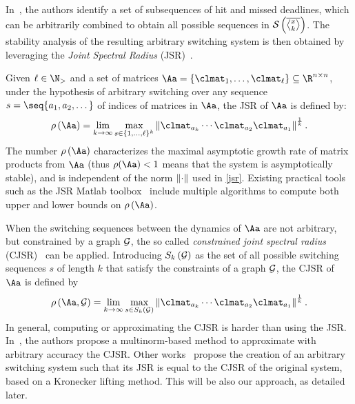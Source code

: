 In~\cite{Maggio:2020}, the authors identify a set of subsequences of hit and missed deadlines, which can be arbitrarily combined to obtain all possible sequences in $\sset{}{\rowmiss{}}$.
The stability analysis of the resulting arbitrary switching system is then obtained by leveraging the \emph{Joint Spectral Radius} (JSR)~\cite{rota}.

Given $\ell \in \N_{>}$ and a set of matrices $\Aa = \{\clmat_1, \ldots, \clmat_\ell \} \subseteq \R^{n\times n}$, under the hypothesis of arbitrary switching over any sequence $s=\seq{a_1,a_2,\dots}$ of indices of matrices in $\Aa$, the JSR of $\Aa$ is defined by:
\begin{equation}%
    \label{jsr}
    \rho\funof{\Aa} = \lim_{k\rightarrow\infty} \max_{s \in \{1,\ldots,\ell\}^k} \norm{\clmat_{a_k} \cdots \clmat_{a_2}\clmat_{a_1}}^{\frac{1}{k}}.
\end{equation}
The number $\rho\left(\Aa\right)$ characterizes the maximal asymptotic growth rate of matrix products from $\Aa$ (thus $\rho(\Aa) < 1$ means that the system is asymptotically stable), and is independent of the norm $\left\lVert\cdot\right\rVert$ used in \eqref{jsr}.
Existing practical tools such as the JSR Matlab toolbox~\cite{vankeerberghen2014jsr} include multiple algorithms to compute both upper and lower bounds on $\rho\left(\Aa\right)$.

When the switching sequences between the dynamics of $\Aa$ are not arbitrary, but constrained by a graph $\mathcal{G}_{}$, the so called \emph{constrained joint spectral radius} (CJSR)~\cite{dai2012gelfand} can be applied.
Introducing $S_k\left( \mathcal{G}_{} \right)$ as the set of all possible switching sequences $s$ of length $k$ that satisfy the constraints of a graph $\mathcal{G}_{}$, the CJSR of $\Aa$ is defined by
\begin{equation}%
    \label{cjsr}%
    \rho\funof{\Aa,\GG{}} = \lim_{k\rightarrow\infty} \max_{s \in S_k\funof{\GG{}}} \norm{\clmat_{a_k} \cdots \clmat_{a_2}\clmat_{a_1}}^{\frac{1}{k}}.
\end{equation}
In general, computing or approximating the CJSR is harder than using the JSR. 
In~\cite{philippe2016stability}, the authors propose a multinorm-based method to approximate with arbitrary accuracy the CJSR.
Other works~\cite{kozyakin2014berger,xu2020approximation} propose the creation of an arbitrary switching system such that its JSR is equal to the CJSR of the original system, based on a Kronecker lifting method.
This will be also our approach, as detailed later.

